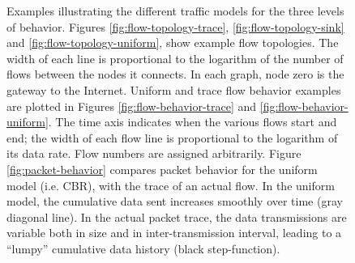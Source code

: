 \documentclass[conference]{IEEEtran}
\begin{document}
\begin{figure}
\begin{center}
\begin{minipage}[c]{0.67\linewidth}
\end{minipage}\hfill
\begin{minipage}[c]{0.30\linewidth}
\caption{Examples illustrating the different traffic models for the three levels of behavior. Figures \ref{fig:flow-topology-trace}, \ref{fig:flow-topology-sink} and \ref{fig:flow-topology-uniform}, show example flow topologies. The width of each line is proportional to the logarithm of the number of flows between the nodes it connects. In each graph, node zero is the gateway to the Internet. Uniform and trace flow behavior examples are plotted in Figures \ref{fig:flow-behavior-trace} and \ref{fig:flow-behavior-uniform}. The time axis indicates when the various flows start and end; the width of each flow line is proportional to the logarithm of its data rate. Flow numbers are assigned arbitrarily. Figure \ref{fig:packet-behavior} compares packet behavior for the uniform model (i.e. {\footnotesize{CBR}}), with the trace of an actual flow. In the uniform model, the cumulative data sent increases smoothly over time (gray diagonal line). In the actual packet trace, the data transmissions are variable both in size and in inter-transmission interval, leading to a ``lumpy'' cumulative data history (black step-function).}
\label{fig:traffic-models}
\end{minipage}
\end{center}
\vspace{-1em}
\end{figure}
\end{document}
